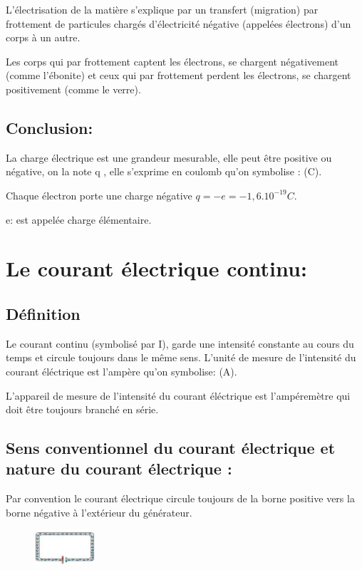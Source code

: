 \documentclass[12pt]{article}
\begin{document}
L'électrisation de la matière s'explique par un transfert (migration) par frottement de particules chargés d'électricité négative
(appelées électrons) d'un corps à un autre.

Les corps qui par frottement captent les électrons, se chargent négativement (comme l'ébonite) et ceux qui par frottement
perdent les électrons, se chargent positivement (comme le verre).
\subsection{Conclusion:}
La charge électrique est une grandeur mesurable, elle peut être positive ou négative, on la note q , elle s'exprime en coulomb
qu'on symbolise : (C).

Chaque électron porte une charge négative $q= -e = -1,6.10^{-19}C$.

e: est appelée charge élémentaire.

\section{Le courant électrique continu:}
\subsection{Définition}
Le courant continu (symbolisé par I), garde une intensité constante au cours du temps et circule toujours dans le même sens.
L'unité de mesure de l'intensité du courant éléctrique est l'ampère qu'on symbolise: (A).

L'appareil de mesure de l'intensité du courant éléctrique est l'ampéremètre qui doit être toujours branché en série.
\subsection{Sens conventionnel du courant électrique et nature du courant électrique :}

Par convention le courant électrique circule toujours de la borne positive vers la borne négative à l’extérieur du générateur.


\begin{figure}
\includegraphics[width=0.2\textwidth]{./img/img_02.png}
\end{figure}
\end{document}
